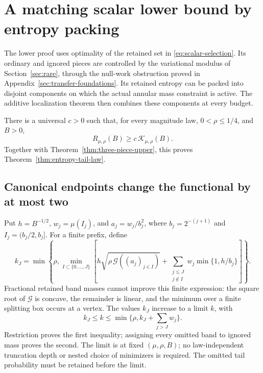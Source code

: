 \section{A matching scalar lower bound by entropy packing}
\label{sec:matching-lower}

The lower proof uses optimality of the retained set in
\eqref{eq:scalar-selection}. Its ordinary and ignored pieces are controlled
by the variational modulus of Section~\ref{sec:rare}, through the
null-work obstruction proved in Appendix~\ref{sec:transfer-foundations}. Its retained entropy can be packed
into disjoint components on which the actual annular mass constraint is
active. The additive localization theorem then combines these components
at every budget.

\begin{theorem}
\label{thm:entropy-tail-lower}
There is a universal $c>0$ such that, for every magnitude law,
$0<\rho\le1/4$, and $B>0$,
\[
 R_{\mu,\rho}(B)\ge c\,\mathcal K_{\mu,\rho}(B).
\]
Together with Theorem~\ref{thm:three-piece-upper}, this proves
Theorem~\ref{thm:entropy-tail-law}.
\end{theorem}

\subsection{Canonical endpoints change the functional by at most two}

Put $h=B^{-1/2}$, $w_j=\mu(I_j)$, and $a_j=w_j/b_j^2$, where
$b_j=2^{-(j+1)}$ and $I_j=(b_j/2,b_j]$.
For a finite prefix, define
\begin{equation}\label{eq:canonical-selection-prefix}
 k_J=\min\left\{\rho,\min_{I\subset\{0,\ldots,J\}}
 \left[h\sqrt{\rho\,\mathcal G((a_j)_{j\in I})}
       +\sum_{\substack{j\le J\\j\notin I}}
                    w_j\min\{1,h/b_j\}\right]\right\}.
\end{equation}
Fractional retained band masses cannot improve this finite expression:
the square root of $\mathcal G$ is concave, the remainder is linear,
and the minimum over a finite splitting box occurs at a vertex.
The values $k_J$ increase to a limit $k$, with
\begin{equation}\label{eq:canonical-prefix-limit}
 k_J\le k\le\min\{\rho,k_J+\sum_{j>J}w_j\}.
\end{equation}
Restriction proves the first inequality; assigning every omitted band to
ignored mass proves the second. The limit is at fixed $(\mu,\rho,B)$;
no law-independent truncation depth or nested choice of minimizers is
required. The omitted tail probability must be retained before the limit.

